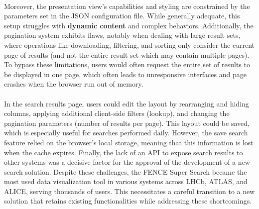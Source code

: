 \paragraph{} Moreover, the presentation view's capabilities and styling are constrained by the parameters set in the JSON configuration file. While generally adequate, this setup struggles with \textbf{dynamic content} and complex behaviors. Additionally, the pagination system exhibits flaws, notably when dealing with large result sets, where operations like downloading, filtering, and sorting only consider the current page of results (and not the entire result set which may contain multiple pages). To bypass these limitations, users would often request the entire set of results to be displayed in one page, which often leads to unresponsive interfaces and page crashes when the browser run out of memory. 

\paragraph{} In the search results page, users could edit the layout by rearranging and hiding columns, applying additional client-side filters (lookup), and changing the pagination parameters (number of results per page). This layout could be saved, which is especially useful for searches performed daily. However, the save search feature relied on the browser's local storage, meaning that this information is lost when the cache expires. Finally, the lack of an API to expose search results to other systems was a decisive factor for the approval of the development of a new search solution. Despite these challenges, the FENCE Super Search became the most used data visualization tool in various systems across LHCb, ATLAS, and ALICE, serving thousands of users. This necessitates a careful transition to a new solution that retains existing functionalities while addressing these shortcomings. 


